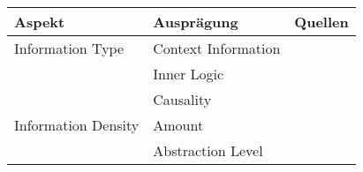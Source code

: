 \begin{table}[bht!]
    \begin{center}
        \begin{tabular}{|p{}|p{}|p{}|}
            \hline
            \textbf{Aspekt}    & \textbf{Ausprägung}   & \textbf{Quellen} \\ \hline
            Information Type    
                                & Context Information &     \cite{chazette2020explainability} \cite{zahedi_towards_2019}
                                                \cite{cassens_ambient_2019} \cite{zahedi_towards_2019}
                                                \cite{zolotas_towards_2019} \cite{chari_explanation_2020}
                                                \cite{nunes_systematic_2017} \cite{ribera2019can} \\
                                & Inner Logic & \cite{chazette2020explainability} \cite{sato_action-triggering_2019} 
                                                \cite{thomson_knowledge--information_2020}
                                                \cite{chari_explanation_2020} \cite{neerincx_using_2018}
                                                \cite{ribera2019can} \cite{cassens_ambient_2019} \\
                                & Causality &   \cite{chazette2020explainability} \cite{abdulrahman_belief-based_2019}
                                                \cite{yamada_evaluating_2016} \cite{sato_action-triggering_2019}
                                                \cite{zahedi_towards_2019} \cite{zahedi_towards_2019}
                                                \cite{zolotas_towards_2019} \cite{cassens_ambient_2019}
                                                \cite{thomson_knowledge--information_2020}
                                                \cite{chari_explanation_2020} \cite{neerincx_using_2018}
                                                \cite{nunes_systematic_2017}\cite{zhu_effects_2020}
                                                \cite{ribera2019can} \cite{lim_2009_assessing} 
                                                \cite{kaptein_personalised_2017} \\
            \hline
            Information Density & Amount &      \cite{ribera2019can} \cite{kouki_user_2017}
                                                \cite{hernandez-bocanegra_effects_2020} \cite{martin_developing_2019} \\
                                & Abstraction Level & \cite{thomson_knowledge--information_2020}

\end{tabular}
\end{center}
\end{table}
